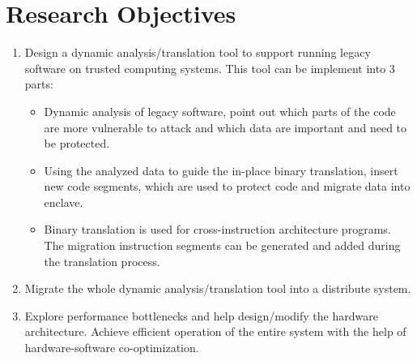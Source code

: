 \section{Research Objectives}
\begin{enumerate}
    \item Design a dynamic analysis/translation tool to support running
    legacy software on trusted computing systems. This tool can be implement
    into 3 parts:
    \begin{itemize}
        \item Dynamic analysis of legacy software, point out which parts of the code are
        more vulnerable to attack and which data are important and need to be protected.
        \item Using the analyzed data to guide the in-place binary translation,
        insert new code segments, which are used to protect code and migrate data into enclave.
        \item Binary translation is used for cross-instruction architecture programs. The migration
        instruction segments can be generated and added during the translation process.
    \end{itemize}
    \item Migrate the whole dynamic analysis/translation tool into a distribute system. 
    \item Explore performance bottlenecks and help design/modify the hardware architecture. 
    Achieve efficient operation of the entire system with the help of hardware-software
    co-optimization.
\end{enumerate}